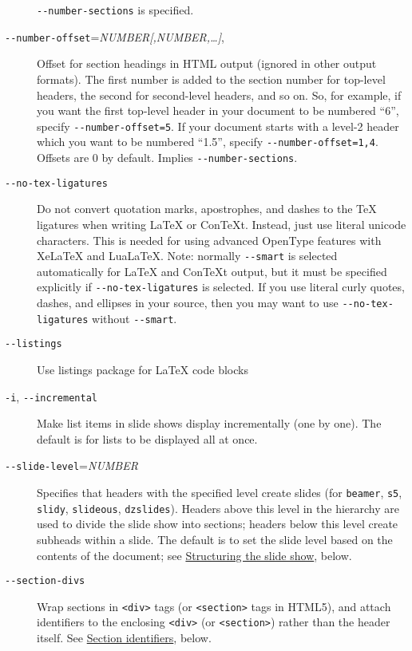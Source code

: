 \documentclass[]{article}
\begin{document}
\begin{description}
\texttt{-{}-number-sections} is specified.
\item[\texttt{-{}-number-offset}=\emph{NUMBER{[},NUMBER,\ldots{}{]}},]
Offset for section headings in HTML output (ignored in other output
formats). The first number is added to the section number for top-level
headers, the second for second-level headers, and so on. So, for
example, if you want the first top-level header in your document to be
numbered ``6'', specify \texttt{-{}-number-offset=5}. If your document
starts with a level-2 header which you want to be numbered ``1.5'',
specify \texttt{-{}-number-offset=1,4}. Offsets are 0 by default.
Implies \texttt{-{}-number-sections}.
\item[\texttt{-{}-no-tex-ligatures}]
Do not convert quotation marks, apostrophes, and dashes to the TeX
ligatures when writing LaTeX or ConTeXt. Instead, just use literal
unicode characters. This is needed for using advanced OpenType features
with XeLaTeX and LuaLaTeX. Note: normally \texttt{-{}-smart} is selected
automatically for LaTeX and ConTeXt output, but it must be specified
explicitly if \texttt{-{}-no-tex-ligatures} is selected. If you use
literal curly quotes, dashes, and ellipses in your source, then you may
want to use \texttt{-{}-no-tex-ligatures} without \texttt{-{}-smart}.
\item[\texttt{-{}-listings}]
Use listings package for LaTeX code blocks
\item[\texttt{-i}, \texttt{-{}-incremental}]
Make list items in slide shows display incrementally (one by one). The
default is for lists to be displayed all at once.
\item[\texttt{-{}-slide-level}=\emph{NUMBER}]
Specifies that headers with the specified level create slides (for
\texttt{beamer}, \texttt{s5}, \texttt{slidy}, \texttt{slideous},
\texttt{dzslides}). Headers above this level in the hierarchy are used
to divide the slide show into sections; headers below this level create
subheads within a slide. The default is to set the slide level based on
the contents of the document; see
\hyperref[structuring-the-slide-show]{Structuring the slide show},
below.
\item[\texttt{-{}-section-divs}]
Wrap sections in \texttt{\textless{}div\textgreater{}} tags (or
\texttt{\textless{}section\textgreater{}} tags in HTML5), and attach
identifiers to the enclosing \texttt{\textless{}div\textgreater{}} (or
\texttt{\textless{}section\textgreater{}}) rather than the header
itself. See
\hyperref[header-identifiers-in-html-latex-and-context]{Section
identifiers}, below.

\end{description}
\end{document}

